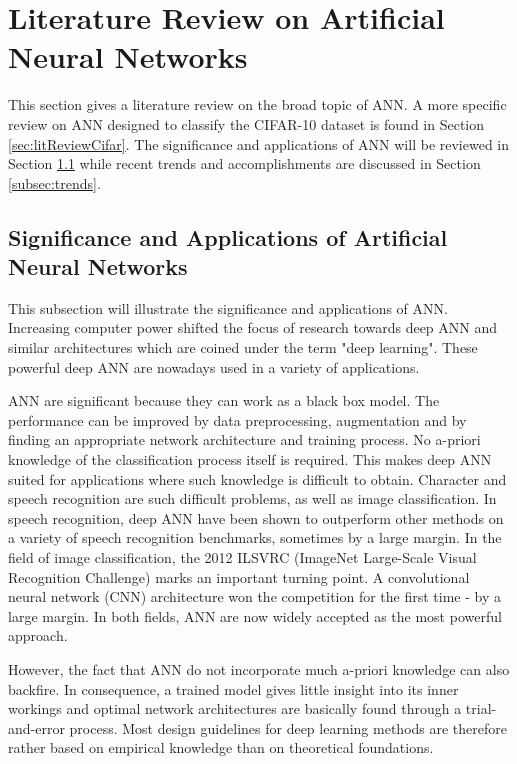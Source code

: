 \section{Literature Review on Artificial Neural Networks}\label{sec:litGeneral}
     \pagestyle{mario}

This section gives a literature review on the broad topic of ANN. A more specific review on ANN designed to classify the CIFAR-10 dataset is found in Section \ref{sec:litReviewCifar}. The significance and applications of ANN will be reviewed in Section \ref{subsec:signif} while recent trends and accomplishments are discussed in Section \ref{subsec:trends}.

\subsection{Significance and Applications of Artificial Neural Networks}\label{subsec:signif}

This subsection will illustrate the significance and applications of ANN. Increasing computer power shifted the focus of research towards deep ANN and similar architectures which are coined under the term "deep learning". These powerful  deep ANN are nowadays used in a variety of applications\cite{deng2014deep}\cite{lecun2015deep}.

ANN are significant because they can work as a black box model. The performance can be improved by data preprocessing, augmentation and by finding an appropriate network architecture and training process. No a-priori knowledge of the classification process itself is required. This makes deep ANN suited for applications where such knowledge is difficult to obtain. Character and speech recognition are such difficult problems, as well as image classification. In speech recognition, deep ANN have been shown to outperform other methods on a variety of speech recognition benchmarks, sometimes by a large margin\cite{hinton2012deep}. In the field of image classification, the 2012 ILSVRC (ImageNet Large-Scale Visual Recognition Challenge) marks an important turning point. A convolutional neural network (CNN) architecture won the competition for the first time - by a large margin\cite{krizhevsky}. In both fields, ANN are now widely accepted as the most powerful approach.

However, the fact that ANN do not incorporate much a-priori knowledge can also backfire. In consequence, a trained model gives little insight into its inner workings and optimal network architectures are basically found through a trial-and-error process. Most design guidelines for deep learning methods are therefore rather based on empirical knowledge than on theoretical foundations.

